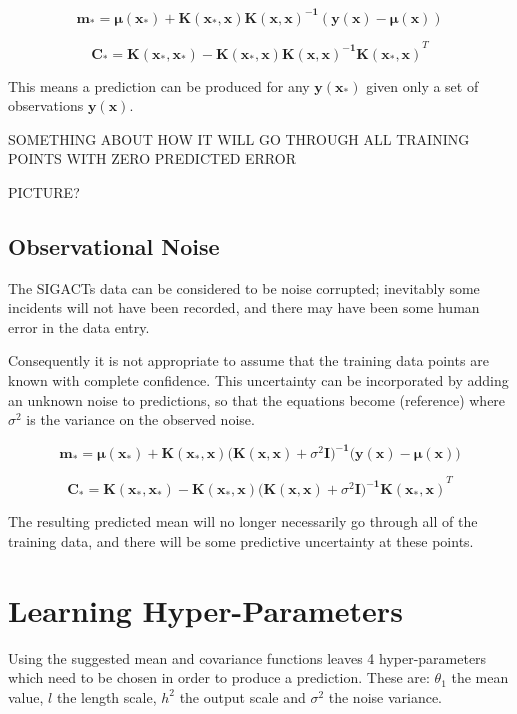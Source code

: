 \documentclass[a4paper,11pt]{report}
\begin{document}
\singlespacing

\begin{equation}
\mathbf{m_* = \mu (x_*) + K(x_* ,x) K(x,x)^{-1} (y(x) - \mu (x))}
\end{equation}

\begin{equation}
\mathbf{ C_* = K(x_*,x_*)-K(x_*,x) K(x,x)^{-1} K(x_*,x)}^{T}
\end{equation}

\doublespacing

This means a prediction can be produced for any \(\mathbf{y(x_*)}\) given only a set of observations \(\mathbf{y(x)}\). 

SOMETHING ABOUT HOW IT WILL GO THROUGH ALL TRAINING POINTS WITH ZERO PREDICTED ERROR

PICTURE?

\subsection{Observational Noise}

The SIGACTs data can be considered to be noise corrupted; inevitably some incidents will not have been recorded, and there may have been some human error in the data entry. 

Consequently it is not appropriate to assume that the training data points are known with complete confidence. This uncertainty can be incorporated by adding an unknown noise to predictions, so that the equations become (reference) where \( \sigma^2 \) is the variance on the observed noise.

\singlespacing


\begin{equation}
\mathbf{m_*} = \boldsymbol{\mu} \mathbf{(x_*) + K(x_* ,x) (K(x,x)}+\sigma^2 \mathbf{I)^{-1} (y(x)} - \boldsymbol{\mu} \mathbf{(x))}
\end{equation}

\begin{equation}
\mathbf{ C_* = K(x_*,x_*)-K(x_*,x) (K(x,x)}+\sigma^2 \mathbf{I)^{-1} K(x_*,x)}^{T}
\end{equation}

\doublespacing

The resulting predicted mean will no longer necessarily go through all of the training data, and there will be some predictive uncertainty at these points.




\section{Learning Hyper-Parameters}
Using the suggested mean and covariance functions leaves 4 hyper-parameters which need to be chosen in order to produce a prediction. These are: \(\theta_1\) the mean value, \(l\) the length scale, \(h^2\) the output scale and \(\sigma^2\) the noise variance. 
\end{document}
